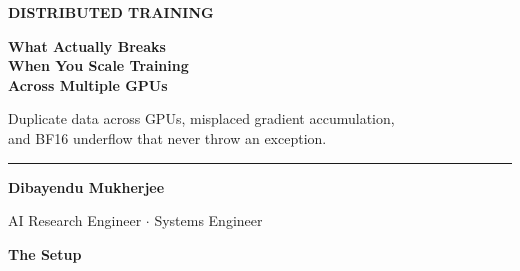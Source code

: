 \documentclass[11pt]{article}
\begin{document}
\thispagestyle{empty}
\vspace*{0.3in}

\begin{center}

    {\fontsize{14}{16}\selectfont\color{brandblue}\textbf{
    DISTRIBUTED TRAINING
    }}

    \vspace{0.4in}

    {\fontsize{36}{44}\selectfont\color{brandnavy}\bfseries
What Actually Breaks\\[0.15in]
When You Scale Training\\[0.15in]
Across Multiple GPUs
}

    \vspace{0.5in}

    {\fontsize{18}{24}\selectfont\color{brandgray}
        Duplicate data across GPUs, misplaced gradient accumulation,\\
        and BF16 underflow that never throw an exception.
        }

    \vfill

    \begin{minipage}{0.8\textwidth}
        \centering
        \rule{0.6\linewidth}{0.5pt}

        \vspace{0.2in}

        {\fontsize{12}{14}\selectfont\color{brandnavy}
        \textbf{Dibayendu Mukherjee}
        }

        \vspace{0.05in}

        {\fontsize{10}{12}\selectfont\color{brandgray}
        AI Research Engineer \quad $\cdot$ \quad Systems Engineer
        }

    \end{minipage}

\end{center}

\newpage

\vspace*{0.2in}

\begin{center}
{\fontsize{26}{30}\selectfont\color{brandnavy}\bfseries 
The Setup}
\end{center}

\vspace{0.2in}
\end{document}
